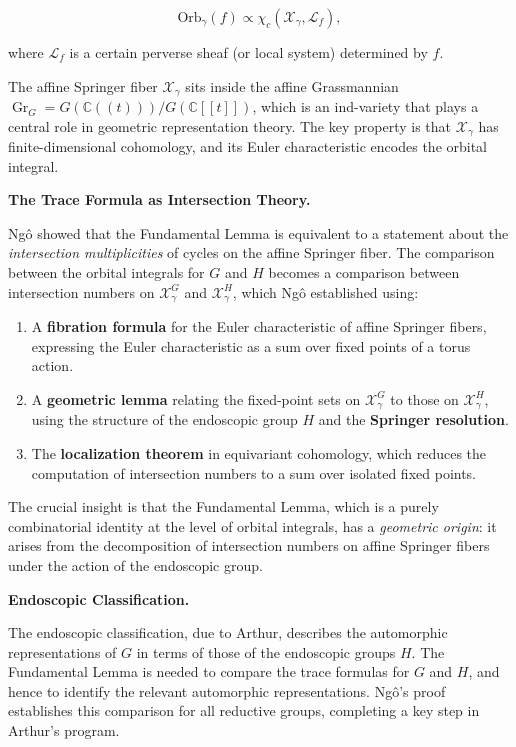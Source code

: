 \[
\text{Orb}_\gamma(f) \propto \chi_c(\mathcal{X}_\gamma, \mathcal{L}_f),
\]

where $\mathcal{L}_f$ is a certain perverse sheaf (or local system) determined by $f$.

The affine Springer fiber $\mathcal{X}_\gamma$ sits inside the affine Grassmannian $\operatorname{Gr}_G = G(\mathbb{C}((t))) / G(\mathbb{C}[[t]])$, which is an ind-variety that plays a central role in geometric representation theory. The key property is that $\mathcal{X}_\gamma$ has finite-dimensional cohomology, and its Euler characteristic encodes the orbital integral.

\textbf{The Trace Formula as Intersection Theory.}

Ngô showed that the Fundamental Lemma is equivalent to a statement about the \emph{intersection multiplicities} of cycles on the affine Springer fiber. The comparison between the orbital integrals for $G$ and $H$ becomes a comparison between intersection numbers on $\mathcal{X}_\gamma^G$ and $\mathcal{X}_\gamma^H$, which Ngô established using:

\begin{enumerate}
  \item A \textbf{fibration formula} for the Euler characteristic of affine Springer fibers, expressing the Euler characteristic as a sum over fixed points of a torus action.
  \item A \textbf{geometric lemma} relating the fixed-point sets on $\mathcal{X}_\gamma^G$ to those on $\mathcal{X}_\gamma^H$, using the structure of the endoscopic group $H$ and the \textbf{Springer resolution}.
  \item The \textbf{localization theorem} in equivariant cohomology, which reduces the computation of intersection numbers to a sum over isolated fixed points.
\end{enumerate}

The crucial insight is that the Fundamental Lemma, which is a purely combinatorial identity at the level of orbital integrals, has a \emph{geometric origin}: it arises from the decomposition of intersection numbers on affine Springer fibers under the action of the endoscopic group.

\textbf{Endoscopic Classification.}

The endoscopic classification, due to Arthur, describes the automorphic representations of $G$ in terms of those of the endoscopic groups $H$. The Fundamental Lemma is needed to compare the trace formulas for $G$ and $H$, and hence to identify the relevant automorphic representations. Ngô's proof establishes this comparison for all reductive groups, completing a key step in Arthur's program.

